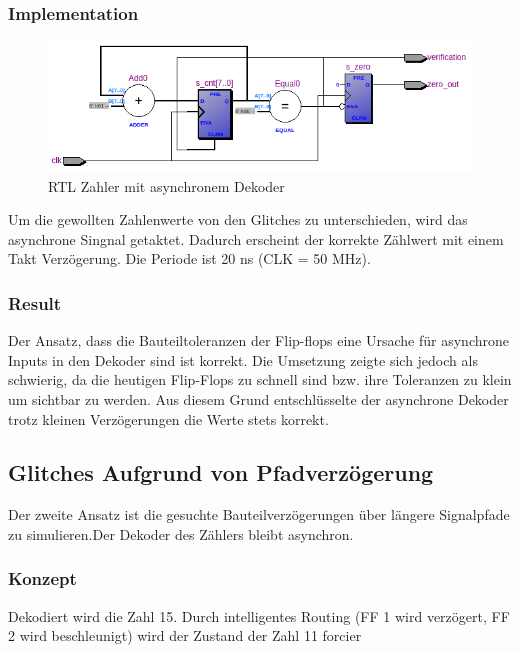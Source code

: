 \subsubsection{Implementation}
\begin{figure}[H]
	\centering
	\includegraphics[width=\textwidth]{images/RTL_counter_2.png}
	\caption{RTL Zahler mit asynchronem Dekoder}
	\label{fig.glitch.counter2}
\end{figure}

Um die gewollten Zahlenwerte von den Glitches zu unterschieden, wird das asynchrone Singnal getaktet. Dadurch erscheint der korrekte Zählwert mit einem Takt Verzögerung. Die Periode ist 20 ns (CLK = 50 MHz).\\


\subsubsection{Result}
Der Ansatz, dass die Bauteiltoleranzen der Flip-flops eine Ursache für asynchrone Inputs in den Dekoder sind ist korrekt. Die Umsetzung zeigte sich jedoch als schwierig, da die heutigen Flip-Flops zu schnell sind bzw. ihre Toleranzen zu klein um sichtbar zu werden.  Aus diesem Grund entschlüsselte der asynchrone Dekoder trotz kleinen Verzögerungen die Werte stets korrekt.\\


\subsection{Glitches Aufgrund von Pfadverzögerung}\label{sect.glitch_toleranzen}
Der zweite Ansatz ist die gesuchte Bauteilverzögerungen über längere Signalpfade zu simulieren.Der Dekoder des Zählers bleibt asynchron. 

\subsubsection{Konzept}
Dekodiert wird die Zahl 15. Durch intelligentes Routing (FF 1 wird verzögert, FF 2 wird beschleunigt) wird der Zustand der Zahl 11 forcier 

